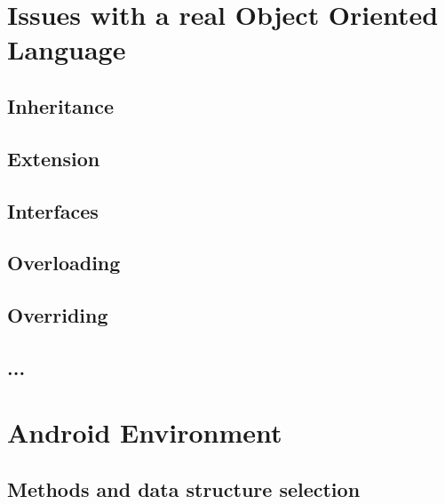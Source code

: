 \documentclass[letterpaper,twocolumn,10pt]{article}
\begin{document}

\section{Issues with a real Object Oriented Language}
\paragraph{}
\subsection{Inheritance}
\subsection{Extension}
\subsection{Interfaces}
\subsection{Overloading}
\subsection{Overriding}
\subsection{...}



\section{Android Environment}
\paragraph{}
\subsection{Methods and data structure selection}
\end{document}

